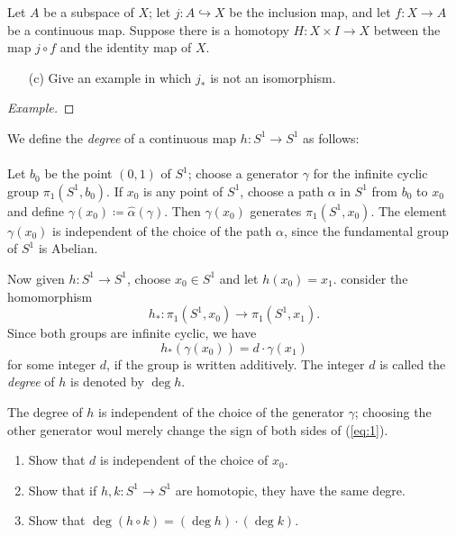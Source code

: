 \begin{problem}[Munkres \S58, Ex.\,7(c)]
Let $A$ be a subspace of $X$; let $j\colon A\hookrightarrow X$ be the
inclusion map, and let $f\colon X\to A$ be a continuous map. Suppose there
is a homotopy $H\colon X\times I\to X$ between the map $j\circ f$ and the
identity map of $X$.
\begin{itemize}
\item[(c)] Give an example in which $j_*$ is not an isomorphism.
\end{itemize}
\end{problem}
\begin{proof}[Example]
\renewcommand\qedsymbol{$\spadesuit$}
\end{proof}
\newpage
\begin{problem}[Munkres \S58, Ex.9(a,b,c)]
We define the \emph{degree} of a continuous map $h\colon S^1\to S^1$ as
follows:
\\\\
Let $b_0$ be the point $(0,1)$ of $S^1$; choose a generator $\gamma$ for
the infinite cyclic group $\pi_1(S^1,b_0)$. If $x_0$ is any point of $S^1$,
choose a path $\alpha$ in $S^1$ from $b_0$ to $x_0$ and define
$\gamma(x_0)\coloneqq\hat\alpha(\gamma)$. Then $\gamma(x_0)$ generates
$\pi_1(S^1,x_0)$. The element $\gamma(x_0)$ is independent of the choice of
the path $\alpha$, since the fundamental group of $S^1$ is Abelian.

Now given $h\colon S^1\to S^1$, choose $x_0\in S^1$ and let
$h(x_0)=x_1$. consider the homomorphism
\[
h_*\colon\pi_1(S^1,x_0)\longrightarrow\pi_1(S^1,x_1).
\]
Since both groups are infinite cyclic, we have
\begin{equation}
\label{eq:1}
\tag{*}
h_*(\gamma(x_0))=d\cdot\gamma(x_1)
\end{equation}
for some integer $d$, if the group is written additively. The integer $d$
is called the \emph{degree} of $h$ is denoted by $\deg h$.

The degree of $h$ is independent of the choice of the generator $\gamma$;
choosing the other generator woul merely change the sign of both sides of
(\ref{eq:1}).
\begin{enumerate}[label=(\alph*)]
\item Show that $d$ is independent of the choice of $x_0$.
\item Show that if $h,k\colon S^1\to S^1$ are homotopic, they have the same
  degre.
\item Show that $\deg(h\circ k)=(\deg h)\cdot(\deg k)$.
\end{enumerate}
\end{problem}
